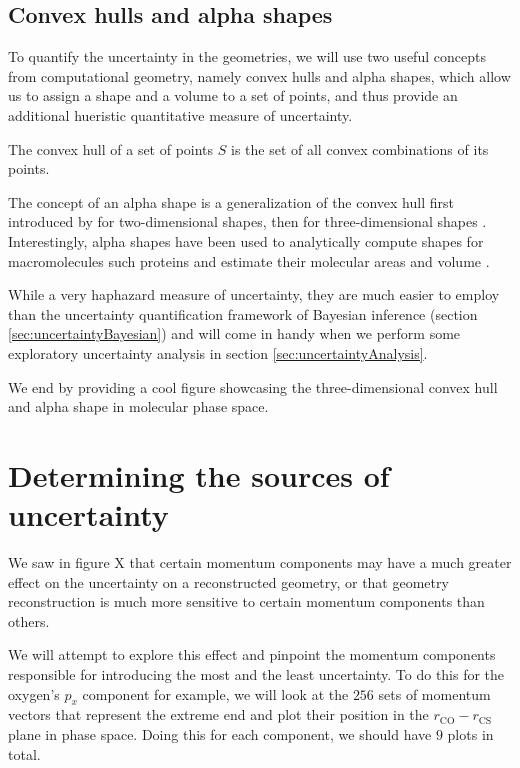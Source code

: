 \subsection{Convex hulls and alpha shapes}
To quantify the uncertainty in the geometries, we will use two useful concepts from computational geometry, namely convex hulls and alpha shapes, which allow us to assign a shape and a volume to a set of points, and thus provide an additional hueristic quantitative measure of uncertainty.

The convex hull of a set of points $S$ is the set of all convex combinations of its points.

The concept of an alpha shape is a generalization of the convex hull first introduced by \citet{Edelsbrunner83} for two-dimensional shapes, then for three-dimensional shapes \citep{Edelsbrunner94}. Interestingly, alpha shapes have been used to analytically compute shapes for macromolecules such proteins and estimate their molecular areas and volume \citep{Liang98}.

While a very haphazard measure of uncertainty, they are much easier to employ than the uncertainty quantification framework of Bayesian inference (section \ref{sec:uncertaintyBayesian}) and will come in handy when we perform some exploratory uncertainty analysis in section \ref{sec:uncertaintyAnalysis}.

We end by providing a cool figure showcasing the three-dimensional convex hull and alpha shape in molecular phase space.


\section{Determining the sources of uncertainty}
We saw in figure X that certain momentum components may have a much greater effect on the uncertainty on a reconstructed geometry, or that geometry reconstruction is much more sensitive to certain momentum components than others.

We will attempt to explore this effect and pinpoint the momentum components responsible for introducing the most and the least uncertainty. To do this for the oxygen's $p_x$ component for example, we will look at the $256$ sets of momentum vectors that represent the extreme end and plot their position in the $r_\mathrm{CO}-r_\mathrm{CS}$ plane in phase space. Doing this for each component, we should have $9$ plots in total.


